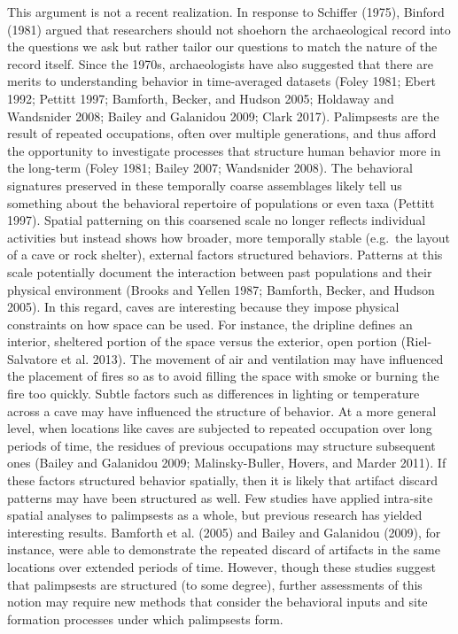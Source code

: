 \documentclass[smallextended]{svjour3}       %
\begin{document}
This argument is not a recent realization. In response to Schiffer
(1975), Binford (1981) argued that researchers should not shoehorn the
archaeological record into the questions we ask but rather tailor our
questions to match the nature of the record itself. Since the 1970s,
archaeologists have also suggested that there are merits to
understanding behavior in time-averaged datasets (Foley 1981; Ebert
1992; Pettitt 1997; Bamforth, Becker, and Hudson 2005; Holdaway and
Wandsnider 2008; Bailey and Galanidou 2009; Clark 2017). Palimpsests are
the result of repeated occupations, often over multiple generations, and
thus afford the opportunity to investigate processes that structure
human behavior more in the long-term (Foley 1981; Bailey 2007;
Wandsnider 2008). The behavioral signatures preserved in these
temporally coarse assemblages likely tell us something about the
behavioral repertoire of populations or even taxa (Pettitt 1997).
Spatial patterning on this coarsened scale no longer reflects individual
activities but instead shows how broader, more temporally stable
(e.g.~the layout of a cave or rock shelter), external factors structured
behaviors. Patterns at this scale potentially document the interaction
between past populations and their physical environment (Brooks and
Yellen 1987; Bamforth, Becker, and Hudson 2005). In this regard, caves
are interesting because they impose physical constraints on how space
can be used. For instance, the dripline defines an interior, sheltered
portion of the space versus the exterior, open portion (Riel-Salvatore
et al. 2013). The movement of air and ventilation may have influenced
the placement of fires so as to avoid filling the space with smoke or
burning the fire too quickly. Subtle factors such as differences in
lighting or temperature across a cave may have influenced the structure
of behavior. At a more general level, when locations like caves are
subjected to repeated occupation over long periods of time, the residues
of previous occupations may structure subsequent ones (Bailey and
Galanidou 2009; Malinsky-Buller, Hovers, and Marder 2011). If these
factors structured behavior spatially, then it is likely that artifact
discard patterns may have been structured as well. Few studies have
applied intra-site spatial analyses to palimpsests as a whole, but
previous research has yielded interesting results. Bamforth et al.
(2005) and Bailey and Galanidou (2009), for instance, were able to
demonstrate the repeated discard of artifacts in the same locations over
extended periods of time. However, though these studies suggest that
palimpsests are structured (to some degree), further assessments of this
notion may require new methods that consider the behavioral inputs and
site formation processes under which palimpsests form.
\end{document}
